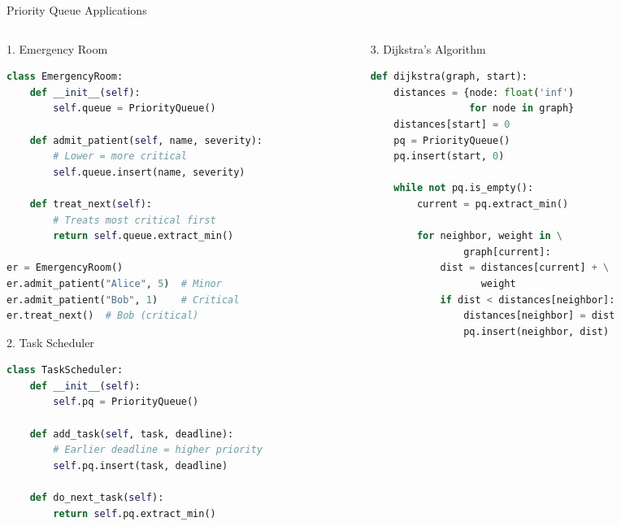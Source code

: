 \documentclass[aspectratio=169,xcolor=dvipsnames]{beamer}
\begin{document}
\begin{frame}[fragile]{Priority Queue Applications}
  \begin{columns}
    \begin{column}{0.48\textwidth}
      \begin{exampleblock}{1. Emergency Room}
        \begin{lstlisting}[language=Python,basicstyle=\tiny\ttfamily]
class EmergencyRoom:
    def __init__(self):
        self.queue = PriorityQueue()

    def admit_patient(self, name, severity):
        # Lower = more critical
        self.queue.insert(name, severity)

    def treat_next(self):
        # Treats most critical first
        return self.queue.extract_min()

er = EmergencyRoom()
er.admit_patient("Alice", 5)  # Minor
er.admit_patient("Bob", 1)    # Critical
er.treat_next()  # Bob (critical)
        \end{lstlisting}
      \end{exampleblock}

      \begin{exampleblock}{2. Task Scheduler}
        \begin{lstlisting}[language=Python,basicstyle=\tiny\ttfamily]
class TaskScheduler:
    def __init__(self):
        self.pq = PriorityQueue()

    def add_task(self, task, deadline):
        # Earlier deadline = higher priority
        self.pq.insert(task, deadline)

    def do_next_task(self):
        return self.pq.extract_min()
        \end{lstlisting}
      \end{exampleblock}
    \end{column}
    \begin{column}{0.48\textwidth}
      \begin{exampleblock}{3. Dijkstra's Algorithm}
        \begin{lstlisting}[language=Python,basicstyle=\tiny\ttfamily]
def dijkstra(graph, start):
    distances = {node: float('inf')
                 for node in graph}
    distances[start] = 0
    pq = PriorityQueue()
    pq.insert(start, 0)

    while not pq.is_empty():
        current = pq.extract_min()

        for neighbor, weight in \
                graph[current]:
            dist = distances[current] + \
                   weight
            if dist < distances[neighbor]:
                distances[neighbor] = dist
                pq.insert(neighbor, dist)


\end{lstlisting}
\end{exampleblock}
\end{column}
\end{columns}
\end{frame}
\end{document}
